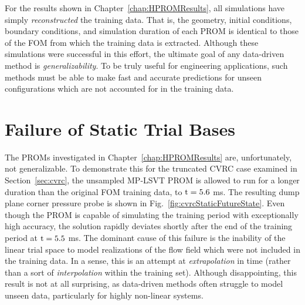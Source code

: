 For the results shown in Chapter~\ref{chap:HPROMResults}, all simulations have simply \textit{reconstructed} the training data. That is, the geometry, initial conditions, boundary conditions, and simulation duration of each PROM is identical to those of the FOM from which the training data is extracted. Although these simulations were successful in this effort, the ultimate goal of any data-driven method is \textit{generalizability}. To be truly useful for engineering applications, such methods must be able to make fast and accurate predictions for unseen configurations which are not accounted for in the training data. 

\section{Failure of Static Trial Bases}

The PROMs investigated in Chapter~\ref{chap:HPROMResults} are, unfortunately, not generalizable. To demonstrate this for the truncated CVRC case examined in Section~\ref{sec:cvrc}, the unsampled MP-LSVT PROM is allowed to run for a longer duration than the original FOM training data, to $\text{t} = 5.6$ ms. The resulting dump plane corner pressure probe is shown in Fig.~\ref{fig:cvrcStaticFutureState}. Even though the PROM is capable of simulating the training period with exceptionally high accuracy, the solution rapidly deviates shortly after the end of the training period at $\text{t} = 5.5$ ms. The dominant cause of this failure is the inability of the linear trial space to model realizations of the flow field which were not included in the training data. In a sense, this is an attempt at \textit{extrapolation} in time (rather than a sort of \textit{interpolation} within the training set). Although disappointing, this result is not at all surprising, as data-driven methods often struggle to model unseen data, particularly for highly non-linear systems.

